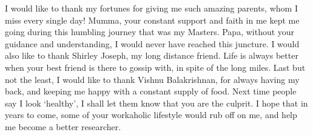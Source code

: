 \documentclass[../main/thesis_msc.tex]{subfiles}
\begin{document}
  \indent    I would like to thank my fortunes for giving me such amazing parents, whom I miss every single day! Mumma, your constant support and faith in me kept me going during this humbling journey that was my Masters. Papa, without your guidance and understanding, I would never have reached this juncture. I would also like to thank Shirley Joseph, my long distance friend. Life is always better when your best friend is there to gossip with, in spite of the long miles.  Last but not the least, I would like to thank Vishnu Balakrishnan, for always having my back, and keeping me happy with a constant supply of food. Next time people say I look `healthy', I shall let them know that you are the culprit. I hope that in years to come, some of your workaholic lifestyle would rub off on me, and help me become a better researcher.

    \newpage
    \mbox{}
    \thispagestyle{empty}
\end{document}
